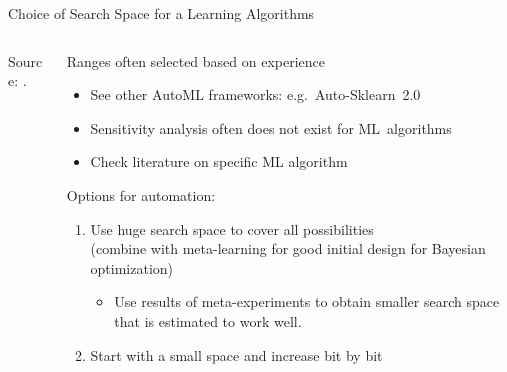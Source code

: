 	  \begin{frame}{Choice of Search Space for a Learning Algorithms}
		\begin{columns}
			
			\begin{column}{0.4\textwidth}
				\begin{center}
					
					{\tiny Source: .}
					
				\end{center}
			\end{column}
			
		  \begin{column}{0.6\textwidth}
		  
		  Ranges often selected based on experience
		  \begin{itemize}
	  
			\item See other AutoML frameworks: e.g.\ Auto-Sklearn~2.0 
	  
			\item Sensitivity analysis often does not exist for ML~algorithms
			\item Check literature on specific ML algorithm
		  \end{itemize}
		  Options for automation:
		  \begin{enumerate}
			\item Use huge search space to cover all possibilities \\ 
				  (combine with meta-learning for good initial design for Bayesian optimization)
			\begin{itemize} 
					\item Use results of meta-experiments to obtain smaller search space that is estimated to work well.
			 \end{itemize}
			   \item Start with a small space and increase bit by bit
		  \end{enumerate}
		  \end{column}%
	  
		\end{columns}
	  \end{frame}
	  
